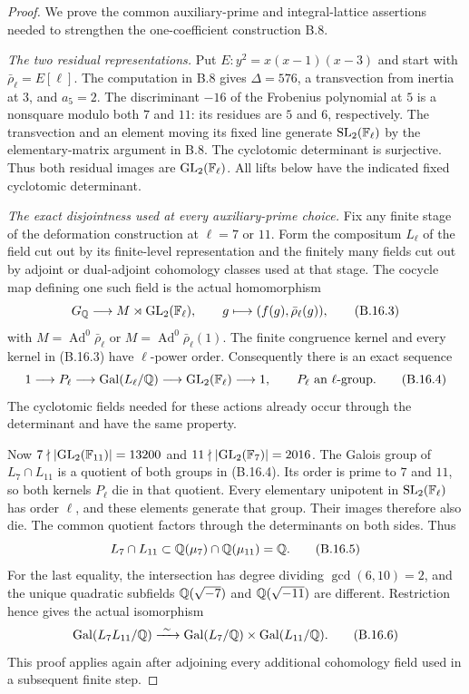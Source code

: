 \begin{proof}
We prove the common auxiliary-prime and integral-lattice assertions
needed to strengthen the one-coefficient construction B.8.

\emph{The two residual representations.}
Put $E:y^2=x(x-1)(x-3)$ and start with $\bar\rho_\ell=E[\ell]$.
The computation in B.8 gives $\Delta=576$, a transvection from
inertia at $3$, and $a_5=2$.  The discriminant $-16$ of the
Frobenius polynomial at $5$ is a nonsquare modulo both $7$ and
$11$: its residues are $5$ and $6$, respectively.
The transvection and an element moving its fixed line generate
$\mathrm{SL}_2(\mathbb F_\ell)$ by the elementary-matrix argument in B.8.
The cyclotomic determinant is surjective.  Thus both residual
images are $\mathrm{GL}_2(\mathbb F_\ell)$.
All lifts below have the indicated fixed cyclotomic determinant.

\emph{The exact disjointness used at every auxiliary-prime choice.}
Fix any finite stage of the deformation construction at $\ell=7$
or $11$.  Form the compositum $L_\ell$ of the field cut out by
its finite-level representation and the finitely many fields
cut out by adjoint or dual-adjoint cohomology classes used at
that stage.  The cocycle map defining one such field is the
actual homomorphism
\[
 G_\mathbb Q\longrightarrow M\rtimes\mathrm{GL}_2(\mathbb F_\ell),
 \qquad g\longmapsto(f(g),\bar\rho_\ell(g)),
 \tag{B.16.3}
\]
with $M=\operatorname{Ad}^0\bar\rho_\ell$ or
$M=\operatorname{Ad}^0\bar\rho_\ell(1)$.
The finite congruence kernel and every kernel in (B.16.3) have
$\ell$-power order.  Consequently there is an exact sequence
\[
 1\longrightarrow P_\ell\longrightarrow
 \operatorname{Gal}(L_\ell/\mathbb Q)
 \longrightarrow\mathrm{GL}_2(\mathbb F_\ell)\longrightarrow1,
 \qquad P_\ell\text{ an }\ell\text{-group}.
 \tag{B.16.4}
\]
The cyclotomic fields needed for these actions already occur
through the determinant and have the same property.

Now $7\nmid|\mathrm{GL}_2(\mathbb F_{11})|=13200$ and
$11\nmid|\mathrm{GL}_2(\mathbb F_7)|=2016$.
The Galois group of $L_7\cap L_{11}$ is a quotient of both
groups in (B.16.4).  Its order is prime to $7$ and $11$, so
both kernels $P_\ell$ die in that quotient.
Every elementary unipotent in $\mathrm{SL}_2(\mathbb F_\ell)$ has
order $\ell$, and these elements generate that group.
Their images therefore also die.  The common quotient factors
through the determinants on both sides.  Thus
\[
 L_7\cap L_{11}\subset\mathbb Q(\mu_7)\cap\mathbb Q(\mu_{11})=\mathbb Q.
 \tag{B.16.5}
\]
For the last equality, the intersection has degree dividing
$\gcd(6,10)=2$, and the unique quadratic subfields
$\mathbb Q(\sqrt{-7})$ and $\mathbb Q(\sqrt{-11})$ are different.
Restriction hence gives the actual isomorphism
\[
 \operatorname{Gal}(L_7L_{11}/\mathbb Q)
   \xrightarrow{\ \sim\ }
 \operatorname{Gal}(L_7/\mathbb Q)\times
 \operatorname{Gal}(L_{11}/\mathbb Q).
 \tag{B.16.6}
\]
This proof applies again after adjoining every additional
cohomology field used in a subsequent finite step.


\end{proof}
